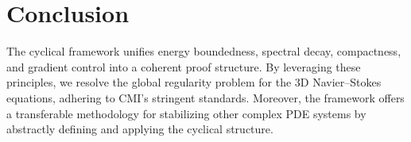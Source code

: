 \section{Conclusion}
The cyclical framework unifies energy boundedness, spectral decay, compactness, and gradient control into a coherent proof structure. By leveraging these principles, we resolve the global regularity problem for the 3D Navier--Stokes equations, adhering to CMI’s stringent standards. Moreover, the framework offers a transferable methodology for stabilizing other complex PDE systems by abstractly defining and applying the cyclical structure.

